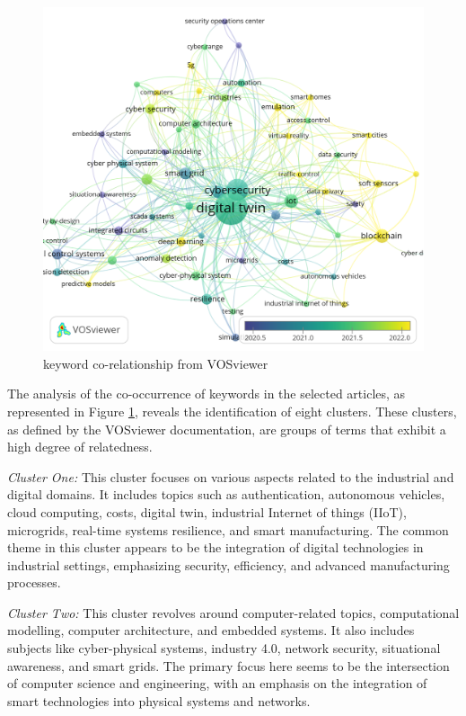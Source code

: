 \begin{figure}[H]
    \includegraphics[width=\textwidth, center]{images/newimages/vosviewer-2oc.png}
    \caption{keyword co-relationship from VOSviewer}
    \label{fig:co-occurrence-vosv}
\end{figure}

The analysis of the co-occurrence of keywords in the selected articles, as represented in Figure \ref{fig:co-occurrence-vosv}, reveals the identification of eight clusters. These clusters, as defined by the VOSviewer documentation, are groups of terms that exhibit a high degree of relatedness. 


\textit{Cluster One:}
This cluster focuses on various aspects related to the industrial and digital domains. It includes topics such as authentication, autonomous vehicles, cloud computing, costs, digital twin, industrial Internet of things (IIoT), microgrids, real-time systems resilience, and smart manufacturing. The common theme in this cluster appears to be the integration of digital technologies in industrial settings, emphasizing security, efficiency, and advanced manufacturing processes.

\textit{Cluster Two:}
This cluster revolves around computer-related topics, computational modelling, computer architecture, and embedded systems. It also includes subjects like cyber-physical systems, industry 4.0, network security, situational awareness, and smart grids. The primary focus here seems to be the intersection of computer science and engineering, with an emphasis on the integration of smart technologies into physical systems and networks.

